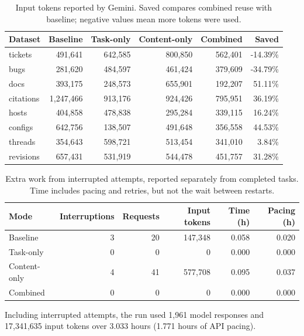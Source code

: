 \begin{table}[ht]
\centering\small
\begin{tabular}{lrrrrr}
\toprule
Dataset & Baseline & Task-only & Content-only & Combined & Saved \\
\midrule
tickets & 491,641 & 642,585 & 800,850 & 562,401 & -14.39\% \\
bugs & 281,620 & 484,597 & 461,424 & 379,609 & -34.79\% \\
docs & 393,175 & 248,573 & 655,901 & 192,207 & 51.11\% \\
citations & 1,247,466 & 913,176 & 924,426 & 795,951 & 36.19\% \\
hosts & 404,858 & 478,838 & 295,284 & 339,115 & 16.24\% \\
configs & 642,756 & 138,507 & 491,648 & 356,558 & 44.53\% \\
threads & 354,643 & 598,721 & 513,454 & 341,010 & 3.84\% \\
revisions & 657,431 & 531,919 & 544,478 & 451,757 & 31.28\% \\
\bottomrule
\end{tabular}
\caption{Input tokens reported by Gemini. Saved compares combined reuse with baseline; negative values mean more tokens were used.}
\label{tab:online-tokens}
\end{table}
\begin{table}[ht]
\centering\small
\begin{tabular}{lrrrrr}
\toprule
Mode & Interruptions & Requests & Input tokens & Time (h) & Pacing (h) \\
\midrule
Baseline & 3 & 20 & 147,348 & 0.058 & 0.020 \\
Task-only & 0 & 0 & 0 & 0.000 & 0.000 \\
Content-only & 4 & 41 & 577,708 & 0.095 & 0.037 \\
Combined & 0 & 0 & 0 & 0.000 & 0.000 \\
\bottomrule
\end{tabular}
\caption{Extra work from interrupted attempts, reported separately from completed tasks. Time includes pacing and retries, but not the wait between restarts.}
\label{tab:online-interruptions}
\end{table}
Including interrupted attempts, the run used 1,961 model responses and 17,341,635 input tokens over 3.033 hours (1.771 hours of API pacing).

